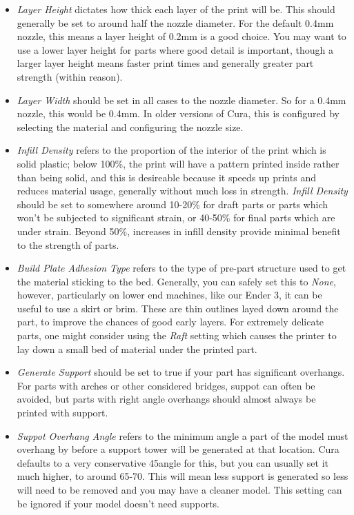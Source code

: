 \documentclass[12pt]{report}
\begin{document}
\begin{itemize}
    \item \textit{Layer Height} dictates how thick each layer of the print will
        be. This should generally be set to around half the
        nozzle diameter. For the default 0.4mm nozzle, this means a layer height
        of 0.2mm is a good choice. You may want to use a lower layer height for
        parts where good detail is important, though a larger layer height means
        faster print times and generally greater part strength (within reason).
    \item \textit{Layer Width} should be set in all cases to the nozzle
        diameter. So for a 0.4mm nozzle, this would be 0.4mm. In older versions
        of Cura, this is configured by selecting the material and configuring
        the nozzle size.
    \item \textit{Infill Density} refers to the proportion of the interior of
        the print which is solid plastic; below 100\%, the print will have a
        pattern printed inside rather than being solid, and this is desireable
        because it speeds up prints and reduces material usage, generally
        without much loss in strength. \textit{Infill Density} should be set
        to somewhere around 10-20\% for draft parts or parts which won't be
        subjected to significant strain, or 40-50\% for final parts which are
        under strain. Beyond 50\%, increases in infill density provide minimal
        benefit to the strength of parts.
    \item \textit{Build Plate Adhesion Type} refers to the type of pre-part
        structure used to get the material sticking to the bed. Generally, you
        can safely set this to \textit{None}, however, particularly on lower end
        machines, like our Ender 3, it can be useful to use a skirt or brim.
        These are thin outlines layed down around the part, to improve the
        chances of good early layers. For extremely delicate parts, one might
        consider using the \textit{Raft} setting which causes the printer to lay
        down a small bed of material under the printed part.
    \item \textit{Generate Support} should be set to true if your part has
        significant overhangs. For parts with arches or other considered
        bridges, suppot can often be avoided, but parts with right angle
        overhangs should almost always be printed with support.
    \item \textit{Suppot Overhang Angle} refers to the minimum angle a part of
        the model must overhang by before a support tower will be generated at
        that location. Cura defaults to a very conservative 45\textdegree angle
        for this, but you can usually set it much higher, to around
        65-70\textdegree. This will mean less support is generated so less will
        need to be removed and you may have a cleaner model. This setting can be
        ignored if your model doesn't need supports.
\end{itemize}
\end{document}
